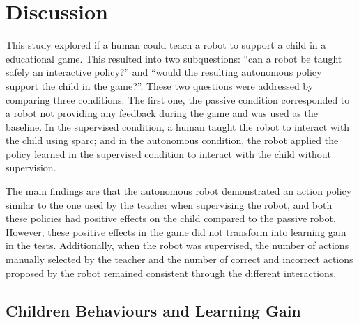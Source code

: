%
%


\section{Discussion} \label{sec:tutoring_discussion}

This study explored if a human could teach a robot to support a child in a educational game. This resulted into two subquestions: ``can a robot be taught safely an interactive policy?'' and ``would the resulting autonomous policy support the child in the game?''. These two questions were addressed by comparing three conditions. The first one, the passive condition corresponded to a robot not providing any feedback during the game and was used as the baseline. In the supervised condition, a human taught the robot to interact with the child using \gls{sparc}; and in the autonomous condition, the robot applied the policy learned in the supervised condition to interact with the child without supervision.

The main findings are that the autonomous robot demonstrated an action policy similar to the one used by the teacher when supervising the robot, and both these policies had positive effects on the child compared to the passive robot. However, these positive effects in the game did not transform into learning gain in the tests. Additionally, when the robot was supervised, the number of actions manually selected by the teacher and the number of correct and incorrect actions proposed by the robot remained consistent through the different interactions.

\subsection{Children Behaviours and Learning Gain}

